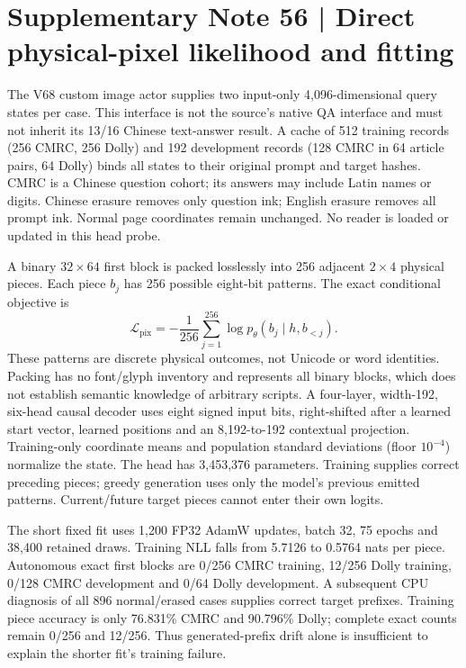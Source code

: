 \clearpage
\section*{Supplementary Note 56 | Direct physical-pixel likelihood and fitting}
\label{note:pixel-density}
The V68 custom image actor supplies two input-only 4,096-dimensional query
states per case. This interface is not the source's native QA interface and
must not inherit its 13/16 Chinese text-answer result. A cache of 512 training
records (256 CMRC, 256 Dolly) and 192 development records (128 CMRC in 64
article pairs, 64 Dolly) binds all states to their original prompt and target
hashes. CMRC is a Chinese question cohort; its answers may include Latin names
or digits. Chinese erasure removes only question ink; English erasure removes
all prompt ink. Normal page coordinates remain unchanged. No reader is loaded
or updated in this head probe.

A binary $32\times64$ first block is packed losslessly into 256 adjacent
$2\times4$ physical pieces. Each piece $b_j$ has 256 possible eight-bit
patterns. The exact conditional objective is
\[
\mathcal L_{\mathrm{pix}}=-\frac{1}{256}\sum_{j=1}^{256}
\log p_\theta(b_j\mid h,b_{<j}).
\]
These patterns are discrete physical outcomes, not Unicode or word identities.
Packing has no font/glyph inventory and represents all binary blocks, which
does not establish semantic knowledge of arbitrary scripts. A four-layer,
width-192, six-head causal decoder uses eight signed input bits, right-shifted
after a learned start vector, learned positions and an 8,192-to-192 contextual
projection. Training-only coordinate means and population standard deviations
(floor $10^{-4}$) normalize the state. The head has 3,453,376 parameters.
Training supplies correct preceding pieces; greedy generation uses only the
model's previous emitted patterns. Current/future target pieces cannot enter
their own logits.

The short fixed fit uses 1,200 FP32 AdamW updates, batch 32, 75 epochs and
38,400 retained draws. Training NLL falls from 5.7126 to 0.5764 nats per piece.
Autonomous exact first blocks are 0/256 CMRC training, 12/256 Dolly training,
0/128 CMRC development and 0/64 Dolly development. A subsequent CPU diagnosis
of all 896 normal/erased cases supplies correct target prefixes. Training
piece accuracy is only 76.831\% CMRC and 90.796\% Dolly; complete exact counts
remain 0/256 and 12/256. Thus generated-prefix drift alone is insufficient to
explain the shorter fit's training failure.

